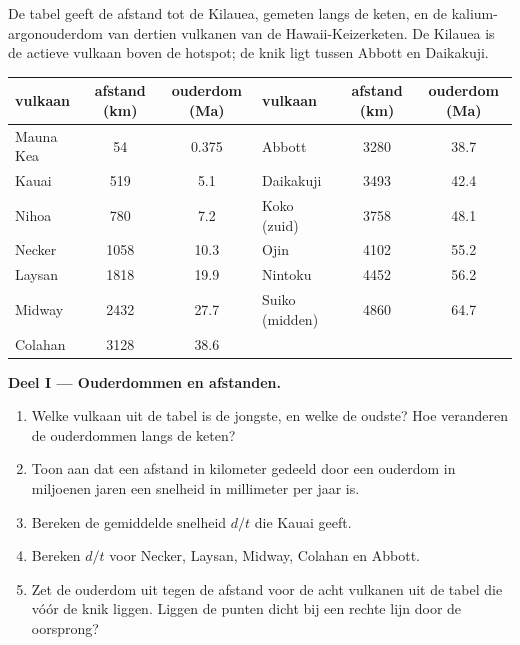 \begin{problem}
\label{pb:g11:plate-motions:1}
De tabel geeft de afstand tot de Kilauea, gemeten langs de keten, en de
kalium-argonouderdom van dertien vulkanen van de Hawaii-Keizerketen.
De Kilauea is de actieve vulkaan boven de hotspot; de knik ligt tussen Abbott
en Daikakuji.

\begin{center}
\small
\begin{tabular}{|l|c|c||l|c|c|}
\hline
vulkaan & afstand (\unit{km}) & ouderdom (\unit{Ma}) & vulkaan & afstand (\unit{km}) & ouderdom (\unit{Ma}) \\ \hline
Mauna Kea & 54 & 0.375 & Abbott & 3280 & 38.7 \\ \hline
Kauai & 519 & 5.1 & Daikakuji & 3493 & 42.4 \\ \hline
Nihoa & 780 & 7.2 & Koko (zuid) & 3758 & 48.1 \\ \hline
Necker & 1058 & 10.3 & Ojin & 4102 & 55.2 \\ \hline
Laysan & 1818 & 19.9 & Nintoku & 4452 & 56.2 \\ \hline
Midway & 2432 & 27.7 & Suiko (midden) & 4860 & 64.7 \\ \hline
Colahan & 3128 & 38.6 & & & \\ \hline
\end{tabular}
\end{center}

\medskip
\noindent\textbf{Deel I --- Ouderdommen en afstanden.}
\begin{enumerate}
  \item Welke vulkaan uit de tabel is de jongste, en welke de oudste? Hoe
        veranderen de ouderdommen langs de keten?
  \item Toon aan dat een afstand in kilometer gedeeld door een ouderdom in miljoenen
        jaren een snelheid in millimeter per jaar is.
  \item Bereken de gemiddelde snelheid $d/t$ die Kauai geeft.
  \item Bereken $d/t$ voor Necker, Laysan, Midway, Colahan en Abbott.
  \item Zet de ouderdom uit tegen de afstand voor de acht vulkanen uit de
        tabel die vóór de knik liggen. Liggen de punten dicht bij een rechte lijn door
        de oorsprong?
\end{enumerate}


\end{problem}
